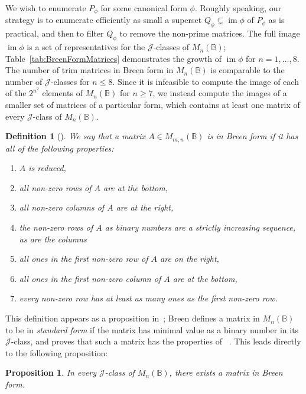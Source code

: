\documentclass[11pt]{article}
\newtheorem{prop}[thm]{Proposition}
\newtheorem{defi}[thm]{Definition}
\newenvironment{de}[1][]{\begin{defi}[#1]\rm}{\end{defi}}
\numberwithin{equation}{section}
\DeclareMathOperator{\im}{im}
\newcommand{\B}{\mathbb{B}}
\newcommand{\Bn}{M_n(\B)}
\newcommand{\Bmn}{M_{m,n}(\B)}
\newcommand{\J}{\mathscr{J}}
\begin{document}
We wish to enumerate $P_\phi$ for some canonical form $\phi$. Roughly speaking,
our strategy is to enumerate efficiently as small a superset $Q_\phi \subsetneq
\im\phi$ of $P_\phi$ as is practical, and then to filter $Q_\phi$ to remove the
non-prime matrices.
The full image $\im\phi$ is a set of representatives for the $\J$-classes of
$\Bn$; Table~\ref{tab:BreenFormMatrices} demonstrates the growth of $\im\phi$ for
$n = 1, \ldots, 8$. The number of trim matrices in Breen form in $\Bn$ is
comparable to the number of $\J$-classes for $n \leq 8$.
Since it is infeasible to compute the image of each of the $2^{n^2}$ elements of
$\Bn$ for $n \geq 7$, we instead compute the images of a smaller set of matrices
of a particular form, which contains at least one matrix of every $\J$-class of
$\Bn$.

\begin{de}[{{\cite[Proposition 3.6]{Breen1997aa}}}]
  We say that a matrix $A \in \Bmn$ is in \emph{Breen form} if it has all of
  the following properties:
  \begin{enumerate}[label={\rm (\roman*)}]
  \item{$A$ is reduced,}
  \item{all non-zero rows of $A$ are at the bottom,}
  \item{all non-zero columns of $A$ are at the right,}
  \item{the non-zero rows of $A$ as binary numbers are a strictly increasing
      sequence, as are the columns}
  \item{all ones in the first non-zero row of $A$ are on the right,}
  \item{all ones in the first non-zero column of $A$ are at the bottom,}
  \item{every non-zero row has at least as many ones as the first non-zero row.}
  \end{enumerate}
\end{de}

This definition appears as a proposition in~\cite{Breen1997aa}; Breen defines a
matrix in $\Bn$ to be in \emph{standard form} if the matrix has minimal value as
a binary number in its $\J$-class, and proves that such a matrix has the
properties of ~\cite[Proposition 3.6]{Breen1997aa}. This leads
directly to the following proposition:

\begin{prop}
  In every $\J$-class of $\Bn$, there exists a matrix in Breen form. 
\end{prop}
\end{document}
